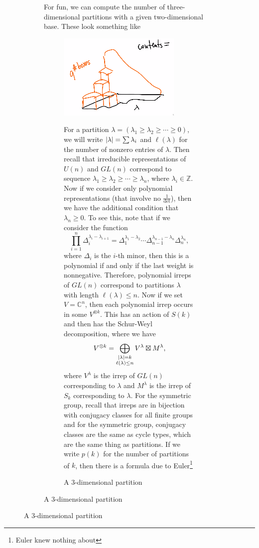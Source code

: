 \documentclass[leqno, openany]{memoir}
\theoremstyle{definition}
\theoremstyle{remark}
\theoremstyle{plain}
\theoremstyle{definition}
\theoremstyle{remark}
\newcommand{\C}{\mathbb{C}}
\newcommand{\Z}{\mathbb{Z}}
\begin{document}
\begin{figure}[H]
\begin{figure}[H]
For fun, we can compute the number of three-dimensional partitions with a given
two-dimensional base. These look something like \begin{figure}[H] \centering
    \includegraphics[scale=0.8]{3dpartition} \caption{A $3$-dimensional
    partition}%

For a partition $\lambda = (\lambda_1 \geq \lambda_2 \geq \cdots \geq 0)$, we
will write $\abs{\lambda} = \sum \lambda_i$ and $\ell(\lambda)$ for the number
of nonzero entries of $\lambda$. Then recall that irreducible representations
of $U(n)$ and $GL(n)$ correspond to sequence $\lambda_1 \geq \lambda_2 \geq
\cdots \geq \lambda_n$, where $\lambda_i \in \Z$. Now if we consider only
polynomial representations (that involve no $\frac{1}{\det}$), then we have the
additional condition that $\lambda_n \geq 0$. To see this, note that if we
consider the function \[ \prod_{i=1}^n \Delta_i^{\lambda_i - \lambda_{i+1}} =
\Delta_1^{\lambda_1 - \lambda_2} \cdots \Delta_{n-1}^{\lambda_{n-1} -
\lambda_n} \Delta_n^{\lambda_n}, \] where $\Delta_i$ is the $i$-th minor, then
this is a polynomial if and only if the last weight is nonnegative. Therefore,
polynomial irreps of $GL(n)$ correspond to partitions $\lambda$ with length
$\ell(\lambda) \leq n$. Now if we set $V = \C^n$, then each polynomial irrep
occurs in some $V^{\otimes k}$. This has an action of $S(k)$ and then has the
Schur-Weyl decomposition, where we have \[ V^{\otimes k} =
\bigoplus_{\substack{\abs{\lambda} = k \\ \ell(\lambda) \leq n}} V^{\lambda}
\boxtimes M^{\lambda}, \] where $V^{\lambda}$ is the irrep of $GL(n)$
corresponding to $\lambda$ and $M^{\lambda}$ is the irrep of $S_k$
corresponding to $\lambda$. For the symmetric group, recall that irreps are in
bijection with conjugacy classes for all finite groups and for the symmetric
group, conjugacy classes are the same as cycle types, which are the same thing
as partitions. If we write $p(k)$ for the number of partitions of $k$, then
there is a formula due to Euler\footnote{Euler knew nothing about
}
\end{figure}
\end{figure}
\end{figure}
\end{document}
